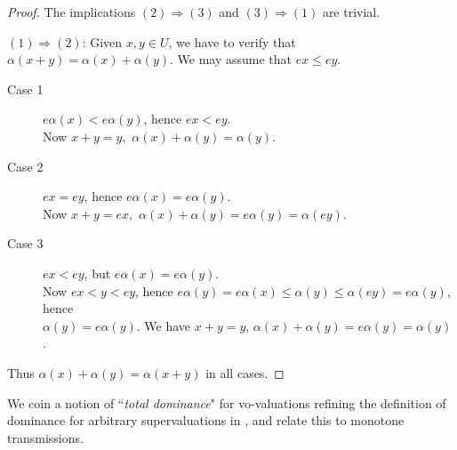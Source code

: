 \documentclass [12pt,a4paper,reqno]{amsart}
\begin{document}
\begin{proof} The implications  $(2) \Rightarrow (3)$ and $(3) \Rightarrow (1)$ are  trivial.

$(1) \Rightarrow (2)$: Given $x,y \in U$, we have to verify that
${\alpha}(x+y) = {\alpha}(x) + {\alpha}(y)$. We may assume that $ex \leq ey$.

\begin{description}
    \item[Case 1]  $e {\alpha} (x) < e {\alpha}(y)$, hence $ex < ey$.
\\
    Now $x + y =y,$ ${\alpha}(x) + {\alpha}(y) = {\alpha}(y)$.

    \item[Case 2] $e x  = e y$, hence $e {\alpha} (x) = e {\alpha}(y)$.
\\
    Now $x + y =ex,$ ${\alpha}(x) + {\alpha}(y) = e{\alpha}(y) = {\alpha}(ey)$.
    \item[Case 3] $e x  < e y$, but $e {\alpha} (x) = e {\alpha}(y)$.
\\
    Now $ex < y < ey$, hence $e {\alpha}(y) = e {\alpha}(x) \leq {\alpha}(y) \leq {\alpha}(ey) = e
    {\alpha}(y)$,  hence \\ ${\alpha}(y) = e{\alpha}(y)$. We have $x+y = y$, ${\alpha}(x) + {\alpha}(y) = e {\alpha}(y) =
    {\alpha}(y)$.
\end{description}
Thus ${\alpha}(x) + {\alpha}(y) = {\alpha}(x+y)$  in all cases.
 \end{proof}

We  coin a notion of ``\emph{total dominance}" for {vo}-valuations
refining the definition of dominance for  arbitrary
supervaluations in \cite[\S5]{IKR1}, and relate this  to monotone
transmissions.
\end{document}
